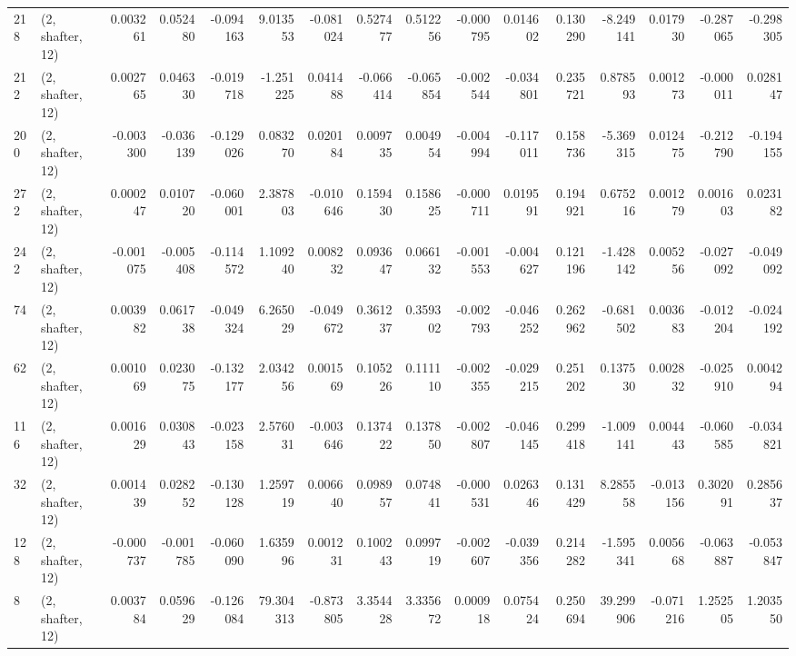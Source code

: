 \begin{tabular}{llrrrrrrrrrrrrrr}
218 &  (2, shafter, 12) &   0.003261 &  0.052480 & -0.094163 &    9.013553 & -0.081024 &   0.527477 &  0.512256 & -0.000795 &  0.014602 &  0.130290 &    -8.249141 &  0.017930 & -0.287065 & -0.298305 \\
212 &  (2, shafter, 12) &   0.002765 &  0.046330 & -0.019718 &   -1.251225 &  0.041488 &  -0.066414 & -0.065854 & -0.002544 & -0.034801 &  0.235721 &     0.878593 &  0.001273 & -0.000011 &  0.028147 \\
200 &  (2, shafter, 12) &  -0.003300 & -0.036139 & -0.129026 &    0.083270 &  0.020184 &   0.009735 &  0.004954 & -0.004994 & -0.117011 &  0.158736 &    -5.369315 &  0.012475 & -0.212790 & -0.194155 \\
272 &  (2, shafter, 12) &   0.000247 &  0.010720 & -0.060001 &    2.387803 & -0.010646 &   0.159430 &  0.158625 & -0.000711 &  0.019591 &  0.194921 &     0.675216 &  0.001279 &  0.001603 &  0.023182 \\
242 &  (2, shafter, 12) &  -0.001075 & -0.005408 & -0.114572 &    1.109240 &  0.008232 &   0.093647 &  0.066132 & -0.001553 & -0.004627 &  0.121196 &    -1.428142 &  0.005256 & -0.027092 & -0.049092 \\
74  &  (2, shafter, 12) &   0.003982 &  0.061738 & -0.049324 &    6.265029 & -0.049672 &   0.361237 &  0.359302 & -0.002793 & -0.046252 &  0.262962 &    -0.681502 &  0.003683 & -0.012204 & -0.024192 \\
62  &  (2, shafter, 12) &   0.001069 &  0.023075 & -0.132177 &    2.034256 &  0.001569 &   0.105226 &  0.111110 & -0.002355 & -0.029215 &  0.251202 &     0.137530 &  0.002832 & -0.025910 &  0.004294 \\
116 &  (2, shafter, 12) &   0.001629 &  0.030843 & -0.023158 &    2.576031 & -0.003646 &   0.137422 &  0.137850 & -0.002807 & -0.046145 &  0.299418 &    -1.009141 &  0.004443 & -0.060585 & -0.034821 \\
32  &  (2, shafter, 12) &   0.001439 &  0.028252 & -0.130128 &    1.259719 &  0.006640 &   0.098957 &  0.074841 & -0.000531 &  0.026346 &  0.131429 &     8.285558 & -0.013156 &  0.302091 &  0.285637 \\
128 &  (2, shafter, 12) &  -0.000737 & -0.001785 & -0.060090 &    1.635996 &  0.001231 &   0.100243 &  0.099719 & -0.002607 & -0.039356 &  0.214282 &    -1.595341 &  0.005668 & -0.063887 & -0.053847 \\
8   &  (2, shafter, 12) &   0.003784 &  0.059629 & -0.126084 &   79.304313 & -0.873805 &   3.354428 &  3.335672 &  0.000918 &  0.075424 &  0.250694 &    39.299906 & -0.071216 &  1.252505 &  1.203550 \\

\end{tabular}
